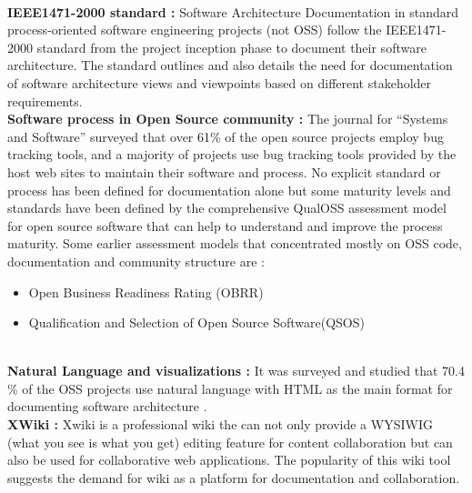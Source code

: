 \newline
\\\indent \textbf{IEEE1471-2000 standard : }Software Architecture Documentation in standard process-oriented software engineering projects (not OSS) follow the IEEE1471-2000 standard \cite{BachmannDocumentingSoftware2010} from the project inception phase to document their software architecture. The standard outlines and also details the need for documentation of software architecture views and viewpoints based on different stakeholder requirements.
\newline
\\\indent \textbf{Software process in Open Source community : } The journal for \enquote{Systems and Software} \cite{Zhao2003} surveyed that over 61\% of the open source projects employ bug tracking tools, and a majority of projects use bug tracking tools provided by the host web sites to maintain their software and process. No explicit standard or process has been defined for documentation alone but some maturity levels and standards have been defined by the comprehensive QualOSS assessment model \cite{5314237}for open source software that can help to understand and improve the process maturity. Some earlier assessment models that concentrated mostly on OSS code, documentation and community structure are :
\begin{itemize}
\item Open Business Readiness Rating (OBRR)\cite{Golden2006}
\item Qualification and Selection of Open Source Software(QSOS)  \cite{qsos}
\end{itemize}
\indent 
\\\indent \textbf{Natural Language and visualizations : } It was surveyed and studied that 70.4 \% of the OSS projects use natural language with HTML as the main format for documenting software architecture \cite{6923128}. 
\newline
\\\indent \textbf{XWiki : } Xwiki \cite{Xwiki_Massol_2014} is a professional wiki the can not only provide a WYSIWIG (what you see is what you get) editing feature for content collaboration but can also be used for collaborative web applications. The popularity of this wiki tool suggests the demand for wiki as a platform for documentation and collaboration.

